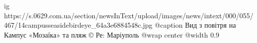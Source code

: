  
 
 
 
 

\ifcmt
  ig https://s.0629.com.ua/section/newsInText/upload/images/news/intext/000/055/467/14campusseasidebirdeye_64a3e6884548c.jpg
  @caption Вид з повітря на Кампус «Мозаїка» та пляж © Ре: Маріуполь
  @wrap center
  @width 0.9
\fi
